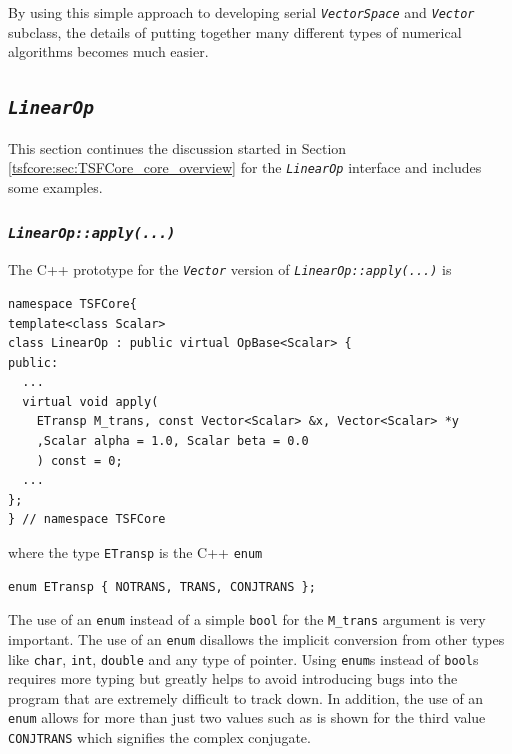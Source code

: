 By using this simple approach to developing serial
{}\texttt{\textit{VectorSpace}} and {}\texttt{\textit{Vector}}
subclass, the details of putting together many different types of
numerical algorithms becomes much easier.

%
\subsection{\texttt{\textit{LinearOp}}}
\label{tsfcore:sec:linear_op}
%

This section continues the discussion started in Section
{}\ref{tsfcore:sec:TSFCore_core_overview} for the
{}\texttt{\textit{LinearOp}} interface and includes some examples.

%
\subsubsection{\texttt{\textit{LinearOp::apply(\-...)}}}
\label{tsfcore:sec:linear_op_apply}
%

The C++ prototype for the {}\texttt{\textit{Vector}} version of
{}\texttt{\textit{LinearOp\-::apply(\-...)}} is

{\scriptsize\begin{verbatim}
namespace TSFCore{
template<class Scalar>
class LinearOp : public virtual OpBase<Scalar> {
public:
  ...
  virtual void apply(
    ETransp M_trans, const Vector<Scalar> &x, Vector<Scalar> *y
    ,Scalar alpha = 1.0, Scalar beta = 0.0
    ) const = 0;
  ...
};
} // namespace TSFCore
\end{verbatim}}

{}\noindent{}where the type {}\texttt{ETransp} is the C++
{}\texttt{enum}

{\scriptsize\begin{verbatim}
enum ETransp { NOTRANS, TRANS, CONJTRANS };
\end{verbatim}}

{}\noindent{}The use of an {}\texttt{enum} instead of a simple
{}\texttt{bool} for the {}\texttt{M\_trans} argument is very
important.  The use of an {}\texttt{enum} disallows the implicit
conversion from other types like {}\texttt{char}, {}\texttt{int},
{}\texttt{double} and any type of pointer.  Using {}\texttt{enum}s
instead of {}\texttt{bool}s requires more typing but greatly helps to
avoid introducing bugs into the program that are extremely difficult
to track down.  In addition, the use of an {}\texttt{enum} allows for
more than just two values such as is shown for the third value
{}\texttt{CONJTRANS} which signifies the complex conjugate.

